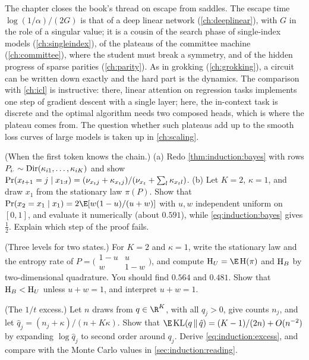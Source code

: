 \begin{refsection}
The chapter closes the book's thread on escape from saddles. The escape time $\log(1/\alpha)/(2G)$ is that of a deep linear network (\cref{ch:deeplinear}), with $G$ in the role of a singular value; it is a cousin of the search phase of single-index models (\cref{ch:singleindex}), of the plateaus of the committee machine (\cref{ch:committee}), where the student must break a symmetry, and of the hidden progress of sparse parities (\cref{ch:parity}). As in grokking (\cref{ch:grokking}), a circuit can be written down exactly and the hard part is the dynamics. The comparison with \cref{ch:icl} is instructive: there, linear attention on regression tasks implements one step of gradient descent with a single layer; here, the in-context task is discrete and the optimal algorithm needs two composed heads, which is where the plateau comes from. The question whether such plateaus add up to the smooth loss curves of large models is taken up in \cref{ch:scaling}.

\begin{exercises}
\item \consolidation (When the first token knows the chain.) (a) Redo \cref{thm:induction:bayes} with rows $P_{i\cdot}\sim\operatorname{Dir}(\kappa_{i1},\dots,\kappa_{iK})$ and show $\Pr(x_{t+1}=j\mid x_{1:t})=(\nu_{x_tj}+\kappa_{x_tj})/(\nu_{x_t}+\sum_l\kappa_{x_tl})$. (b) Let $K=2$, $\kappa=1$, and draw $x_1$ from the stationary law $\pi(P)$. Show that $\Pr(x_2=x_1\mid x_1)=2\E[w(1-u)/(u+w)]$ with $u,w$ independent uniform on $[0,1]$, and evaluate it numerically (about $0.591$), while \eqref{eq:induction:bayes} gives $\frac12$. Explain which step of the proof fails. \label{ex:induction:stationary}

\item \consolidation (Three levels for two states.) For $K=2$ and $\kappa=1$, write the stationary law and the entropy rate of $P=\bigl(\begin{smallmatrix}1-u&u\\w&1-w\end{smallmatrix}\bigr)$, and compute $\indH_U=\E\,\indH(\pi)$ and $\mathrm{H}_B$ by two-dimensional quadrature. You should find $0.564$ and $0.481$. Show that $\mathrm{H}_B<\mathrm{H}_U$ unless $u+w=1$, and interpret $u+w=1$. \label{ex:induction:k2}

\item \consolidation (The $1/t$ excess.) Let $n$ draws from $q\in\R^K$, with all $q_j>0$, give counts $n_j$, and let $\hat q_j=(n_j+\kappa)/(n+K\kappa)$. Show that $\E\,\mathrm{KL}(q\,\|\,\hat q)=(K-1)/(2n)+O(n^{-2})$ by expanding $\log\hat q_j$ to second order around $q_j$. Derive \eqref{eq:induction:excess}, and compare with the Monte Carlo values in \cref{sec:induction:reading}. \label{ex:induction:excess}


\end{exercises}
\end{refsection}
